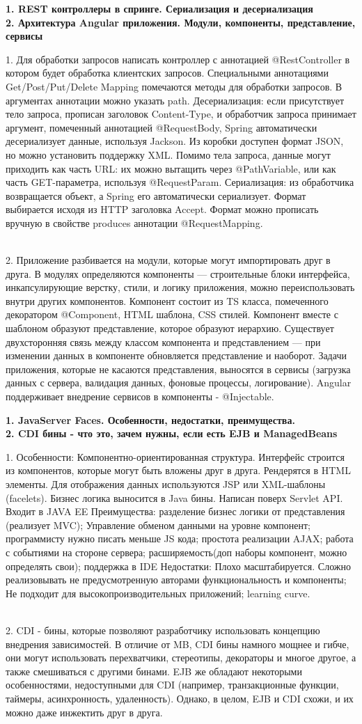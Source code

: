 \documentclass{article}
\newcommand{\bil}[4]{%
    \begin{minipage}{.3\textwidth}
        \textbf{1. #1} \\
        \textbf{2. #2}

        1. #3
        \\
        2. #4
    \end{minipage}
}
\begin{document}
\hfill
\bil{REST контроллеры в спринге. Сериализация и десериализация}{Архитектура Angular приложения. Модули, компоненты, представление, сервисы}{
    Для обработки запросов написать контроллер с аннотацией @RestController в котором будет обработка клиентских запросов.
    Специальными аннотациями Get/Post/Put/Delete Mapping помечаются методы для обработки запросов. 
    В аргументах аннотации можно указать path.
    Десериализация: если присутствует тело запроса, прописан заголовок Content-Type, и обработчик запроса принимает аргумент, помеченный аннотацией @RequestBody, 
    Spring автоматически десериализует данные, используя Jackson. Из коробки доступен формат JSON, но можно установить поддержку XML. Помимо тела запроса, данные могут приходить как часть URL: 
    их можно вытащить через @PathVariable, или как часть GET-параметра, используя @RequestParam.
    Сериализация: из обработчика возвращается объект, а Spring его автоматически сериализует. 
    Формат выбирается исходя из HTTP заголовка Accept. Формат можно прописать вручную в свойстве produces аннотации @RequestMapping.
}{
    Приложение разбивается на модули, которые могут импортировать друг в друга. 
    В модулях определяются компоненты — строительные блоки интерфейса, инкапсулирующие верстку, стили, и логику приложения, можно переиспользовать внутри других компонентов. 
    Компонент состоит из TS класса, помеченного декоратором @Component, HTML шаблона, CSS стилей. 
    Компонент вместе с шаблоном образуют представление, которое образуют иерархию. 
    Существует двухсторонняя связь между классом компонента и представлением — при изменении данных в компоненте обновляется представление и наоборот.
    Задачи приложения, которые не касаются представления, выносятся в сервисы (загрузка данных с сервера, валидация данных, фоновые процессы, логирование). 
    Angular поддерживает внедрение сервисов в компоненты - @Injectable.
}
\hfill
\bil{JavaServer Faces. Особенности, недостатки, преимущества.}{CDI бины - что это, зачем нужны, если есть EJB и ManagedBeans}{
    Особенности: Компонентно-ориентированная структура. Интерфейс строится из компонентов, которые могут быть вложены друг в друга. Рендерятся в HTML элементы.
    Для отображения данных используются JSP или XML-шаблоны (facelets).
    Бизнес логика выносится в Java бины.
    Написан поверх Servlet API. Входит в JAVA EE
    Преимущества: разделение бизнес логики от представления (реализует MVC);
    Управление обменом данными на уровне компонент;
    программисту нужно писать меньше JS кода;
    простота реализации AJAX;
    работа с событиями на стороне сервера;
    расширяемость(доп наборы компонент, можно определять свои);
    поддержка в IDE
    Недостатки:
    Плохо масштабируется. Сложно реализовывать не предусмотренную авторами функциональность и компоненты;
    Не подходит для высокопроизводительных приложений;
    learning curve.
}{
    CDI - бины, которые позволяют разработчику использовать концепцию внедрения зависимостей. 
    В отличие от MB, CDI бины намного мощнее и гибче, они могут использовать перехватчики, стереотипы, декораторы и многое другое, а также смешиваться с другими бинами. 
    EJB же обладают некоторыми особенностями, недоступными для CDI (например, транзакционные функции, таймеры, асинхронность, удаленность). 
    Однако, в целом, EJB и CDI схожи, и их можно даже инжектить друг в друга. 
}
\end{document}
